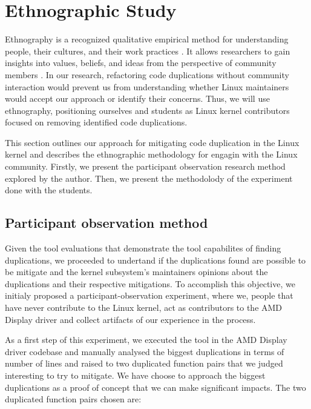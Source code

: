 \section{Ethnographic Study}

\label{sec:meteth}

Ethnography is a recognized qualitative empirical method for understanding people, 
their cultures, and their work practices \citep{bookethno}. It allows researchers 
to gain insights into values, beliefs, and ideas from the perspective of community 
members \citep{ethnosoft}. In our research, refactoring code duplications without 
community interaction would prevent us from understanding whether Linux maintainers 
would accept our approach or identify their concerns. Thus, we will use ethnography, 
positioning ourselves and students as Linux kernel contributors focused on removing 
identified  code duplications.

This section outlines our approach for mitigating code duplication in the Linux kernel
and describes the ethnographic methodology for engagin with the Linux community. Firstly, 
we present the participant observation research method explored by the author. Then, 
we present the methodolody of the experiment done with the students.

\subsection{Participant observation method}
\label{subsec:partmethod}

Given the tool evaluations that demonstrate the tool capabilites of finding duplications, 
we proceeded to undertand if the duplications found are possible to be mitigate and
the kernel subsystem's maintainers opinions about the duplications and their respective mitigations.
To accomplish this objective, we initialy proposed a participant-observation experiment, 
where we, people that have never contribute to the Linux kernel, 
act as contributors to the AMD Display driver and collect artifacts of our experience in the process.

As a first step of this experiment, we executed the tool in the AMD Display driver codebase and 
manually analysed the biggest duplications in terms of number of lines and raised to 
two duplicated function pairs that we judged interesting to try to mitigate. 
We have choose to approach the biggest duplications as a proof of concept that 
we can make significant impacts. The two duplicated function pairs chosen are:

